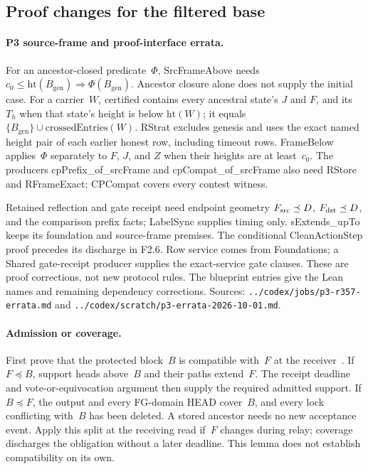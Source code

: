 \documentclass{article}
\theoremstyle{plain}
\theoremstyle{definition}
\theoremstyle{remark}
\newcommand{\genesis}{B_{\mathrm{gen}}}
\begin{document}
\subsection{Proof changes for the filtered base}\label{sec:filtered-proofs}

\paragraph{P3 source-frame and proof-interface errata.}
For an ancestor-closed predicate~$\Phi$, \textsf{SrcFrameAbove} needs
$c_0\leq\mathrm{ht}(\genesis)\Rightarrow\Phi(\genesis)$.
Ancestor closure alone does not supply the initial case.
For a carrier~$W$, \textsf{certified} contains every ancestral
state's $J$ and $F$, and its $T_h$ when that state's height is below
$\mathrm{ht}(W)$;
it equals $\{\genesis\}\cup\mathrm{crossedEntries}(W)$.
\textsf{RStrat} excludes genesis and uses the exact named height pair
of each earlier honest row, including timeout rows.
\textsf{FrameBelow} applies~$\Phi$ separately to $F$, $J$, and $Z$
when their heights are at least~$c_0$.
The producers \textsf{cpPrefix\_of\_srcFrame} and
\textsf{cpCompat\_of\_srcFrame} also need \textsf{RStore} and
\textsf{RFrameExact}; \textsf{CPCompat} covers every contest witness.

Retained reflection and gate receipt need endpoint geometry
$F_{\rm src}\preceq D$, $F_{\rm dst}\preceq D$, and the comparison
prefix facts; \textsf{LabelSync} supplies timing only.
\textsf{sExtends\_upTo} keeps its foundation and source-frame premises.
The conditional \textsf{CleanActionStep} proof precedes its discharge
in F2.6.  Row service comes from Foundations; a Shared gate-receipt
producer supplies the exact-service gate clauses.  These are proof
corrections, not new protocol rules.  The blueprint entries give the
Lean names and remaining dependency corrections.  Sources:
\nolinkurl{../codex/jobs/p3-r357-errata.md} and
\nolinkurl{../codex/scratch/p3-errata-2026-10-01.md}.

\paragraph{Admission or coverage.}  First prove that the protected
block~$B$ is compatible with~$F$ at the receiver~\cite[\S3]{FB}.
If $F\preceq B$, support heads above~$B$ and their paths extend~$F$.
The receipt deadline and vote-or-equivocation argument then supply
the required admitted support.  If $B\preceq F$, the output and every
FG-domain HEAD cover~$B$, and every lock conflicting with~$B$ has
been deleted.  A stored ancestor needs no new acceptance event.
Apply this split at the receiving read if~$F$ changes during relay;
coverage discharges the obligation without a later deadline.  This
lemma does not establish compatibility on its own.
\end{document}
